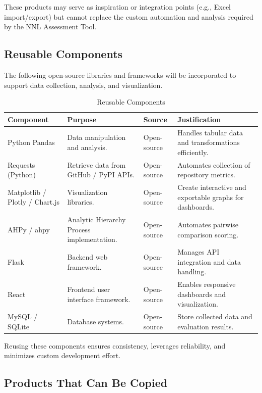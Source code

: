 \documentclass[12pt]{article}
\begin{document}
These products may serve as inspiration or integration points (e.g., Excel import/export) but cannot replace the custom automation and analysis required by the NNL Assessment Tool.

\subsection{Reusable Components}

The following open-source libraries and frameworks will be incorporated to support data collection, analysis, and visualization.

\begin{table}[H]
\centering
\caption{Reusable Components}
\setlength{\tabcolsep}{4pt}
\renewcommand{\arraystretch}{1.2}
\footnotesize

\begin{tabularx}{\textwidth}{p{2.7cm} Y Y Y}
\toprule
\textbf{Component} & \textbf{Purpose} & \textbf{Source} & \textbf{Justification} \\
\midrule
{}
Python Pandas &
Data manipulation and analysis. &
Open-source &
Handles tabular data and transformations efficiently. \\
\hline
Requests (Python) &
Retrieve data from GitHub / PyPI APIs. &
Open-source &
Automates collection of repository metrics. \\
\hline
Matplotlib / Plotly / Chart.js &
Visualization libraries. &
Open-source &
Create interactive and exportable graphs for dashboards. \\
\hline
AHPy / ahpy &
Analytic Hierarchy Process implementation. &
Open-source &
Automates pairwise comparison scoring. \\
\hline
Flask &
Backend web framework. &
Open-source &
Manages API integration and data handling. \\
\hline
React &
Frontend user interface framework. &
Open-source &
Enables responsive dashboards and visualization. \\
\hline
MySQL / SQLite &
Database systems. &
Open-source &
Store collected data and evaluation results. \\
\bottomrule
\end{tabularx}
\end{table}


Reusing these components ensures consistency, leverages reliability, and minimizes custom development effort.

\subsection{Products That Can Be Copied}
\end{document}
